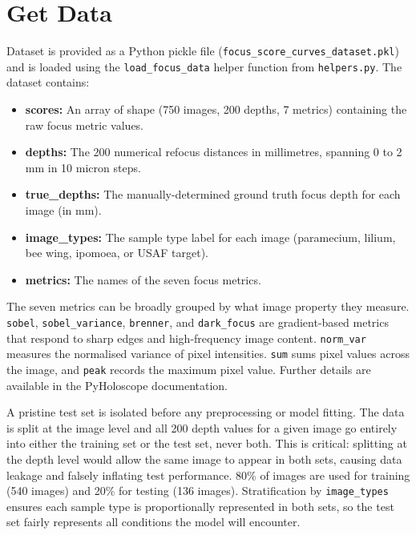 \documentclass{article}
\begin{document}
\section{Get Data}

Dataset is provided as a Python pickle file (\texttt{focus\_score\_curves\_dataset.pkl})\cite{Ridge} and is loaded using the \texttt{load\_focus\_data} helper function from \texttt{helpers.py}.\cite{Helpers}  The dataset contains:

\begin{itemize}
    \item\textbf{scores:} An array of shape (750 images, 200 depths, 7 metrics) containing the raw focus metric values.
    \item\textbf{depths:} The 200 numerical refocus distances in millimetres, spanning 0 to 2 mm in 10 micron steps.
    \item\textbf{true\_depths:} The manually-determined ground truth focus depth for each image (in mm).
    \item\textbf{image\_types:} The sample type label for each image (paramecium, lilium, bee wing, ipomoea, or USAF target).
    \item\textbf{metrics:} The names of the seven focus metrics.
\end{itemize}

The seven metrics can be broadly grouped by what image property they measure. \texttt{sobel}, \texttt{sobel\_variance}, \texttt{brenner}, and \texttt{dark\_focus} are gradient-based metrics that respond to sharp edges and high-frequency image content. \texttt{norm\_var} measures the normalised variance of pixel intensities. \texttt{sum} sums pixel values across the image, and \texttt{peak} records the maximum pixel value. Further details are available in the PyHoloscope documentation.\cite{Helpers} \cite{Pyholoscope}

A pristine test set is isolated before any preprocessing or model fitting. The data is split at the image level and all 200 depth values for a given image go entirely into either the training set or the test set, never both. This is critical: splitting at the depth level would allow the same image to appear in both sets, causing data leakage and falsely inflating test performance. 80\% of images are used for training (540 images) and 20\% for testing (136 images). Stratification by \texttt{image\_types} ensures each sample type is proportionally represented in both sets, so the test set fairly represents all conditions the model will encounter. \cite{Textbook}
\end{document}

